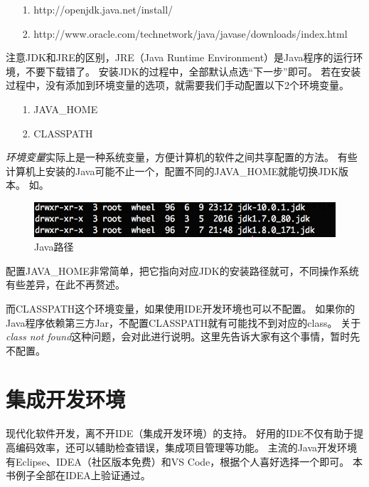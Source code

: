 \begin{itemize}
\item[1.]http://openjdk.java.net/install/
\item[2.]http://www.oracle.com/technetwork/java/javase/downloads/index.html
\end{itemize}

\noindent
注意JDK和JRE的区别，JRE（Java Runtime Environment）是Java程序的运行环境，不要下载错了。
安装JDK的过程中，全部默认点选“下一步”即可。
若在安装过程中，没有添加到环境变量的选项，就需要我们手动配置以下2个环境变量。

\begin{itemize}
\item[1.]JAVA\_HOME
\item[2.]CLASSPATH
\end{itemize}

\emph{环境变量}实际上是一种系统变量，方便计算机的软件之间共享配置的方法。
有些计算机上安装的Java可能不止一个，配置不同的JAVA\_HOME就能切换JDK版本。
如。

\begin{figure}[!htb]
\centerline{\includegraphics{images/java_home.png}}
\caption{Java路径}
\label{fig:part1_java_home}
\end{figure}

配置JAVA\_HOME非常简单，把它指向对应JDK的安装路径就可，不同操作系统有些差异，在此不再赘述。

而CLASSPATH这个环境变量，如果使用IDE开发环境也可以不配置。
如果你的Java程序依赖第三方Jar，不配置CLASSPATH就有可能找不到对应的class。
关于\emph{class not found}这种问题，会对此进行说明。这里先告诉大家有这个事情，暂时先不配置。

\section{集成开发环境}
现代化软件开发，离不开IDE（集成开发环境）的支持。
好用的IDE不仅有助于提高编码效率，还可以辅助检查错误，集成项目管理等功能。
主流的Java开发环境有Eclipse、IDEA（社区版本免费）和VS Code，根据个人喜好选择一个即可。
本书例子全部在IDEA上验证通过。

